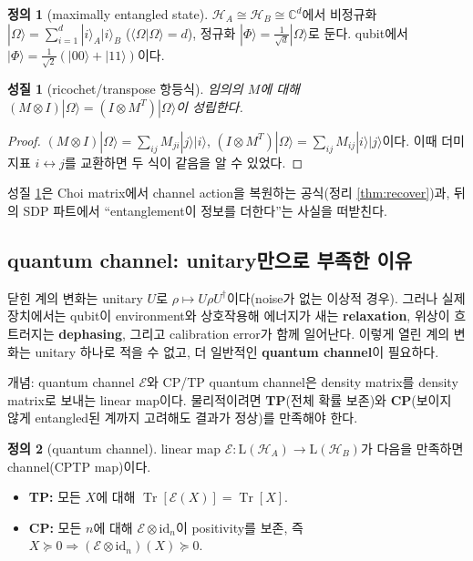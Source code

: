 \documentclass[11pt,a4paper]{article}
\newcommand{\E}{\mathcal{E}}
\newcommand{\Hcal}{\mathcal{H}}
\newcommand{\Tr}{\operatorname{Tr}}
\newcommand{\id}{\mathrm{id}}
\newcommand{\Lin}{\mathrm{L}}
\theoremstyle{definition}
\newtheorem{definition}{정의}[section]
\theoremstyle{plain}
\newtheorem{property}{성질}[section]
\theoremstyle{remark}
\begin{document}
\begin{definition}[maximally entangled state]
$\Hcal_A\cong\Hcal_B\cong\mathbb C^d$에서 비정규화 $|\Omega\rangle=\sum_{i=1}^d|i\rangle_A|i\rangle_B$ ($\langle\Omega|\Omega\rangle=d$), 정규화 $|\Phi\rangle=\tfrac1{\sqrt d}|\Omega\rangle$로 둔다. qubit에서 $|\Phi\rangle=\tfrac1{\sqrt2}(|00\rangle+|11\rangle)$이다.
\end{definition}

\begin{property}[ricochet/transpose 항등식]\label{prop:ricochet}
임의의 $M$에 대해 $(M\otimes I)|\Omega\rangle=(I\otimes M^T)|\Omega\rangle$이 성립한다.
\end{property}
\begin{proof}
$(M\otimes I)|\Omega\rangle=\sum_{ij}M_{ji}|j\rangle|i\rangle$, $(I\otimes M^T)|\Omega\rangle=\sum_{ij}M_{ij}|i\rangle|j\rangle$이다. 이때 더미 지표 $i\leftrightarrow j$를 교환하면 두 식이 같음을 알 수 있었다.
\end{proof}

성질 \ref{prop:ricochet}은 Choi matrix에서 channel action을 복원하는 공식(정리 \ref{thm:recover})과, 뒤의 SDP 파트에서 ``entanglement이 정보를 더한다''는 사실을 떠받친다.

\subsection{quantum channel: unitary만으로 부족한 이유}

닫힌 계의 변화는 unitary $U$로 $\rho\mapsto U\rho U^\dagger$이다(noise가 없는 이상적 경우). 그러나 실제 장치에서는 qubit이 environment와 상호작용해 에너지가 새는 \textbf{relaxation}, 위상이 흐트러지는 \textbf{dephasing}, 그리고 calibration error가 함께 일어난다. 이렇게 열린 계의 변화는 unitary 하나로 적을 수 없고, 더 일반적인 \textbf{quantum channel}이 필요하다.

\begin{conceptbox}{개념: quantum channel $\E$와 CP/TP}
quantum channel은 density matrix를 density matrix로 보내는 linear map이다. 물리적이려면 \textbf{TP}(전체 확률 보존)와 \textbf{CP}(보이지 않게 entangled된 계까지 고려해도 결과가 정상)를 만족해야 한다.
\end{conceptbox}

\begin{definition}[quantum channel]
linear map $\E:\Lin(\Hcal_A)\to\Lin(\Hcal_B)$가 다음을 만족하면 channel(CPTP map)이다.
\begin{itemize}[leftmargin=1.6em]
  \item \textbf{TP:} 모든 $X$에 대해 $\Tr[\E(X)]=\Tr[X]$.
  \item \textbf{CP:} 모든 $n$에 대해 $\E\otimes\id_n$이 positivity를 보존, 즉 $X\succeq0\Rightarrow(\E\otimes\id_n)(X)\succeq0$.
\end{itemize}
\end{definition}
\end{document}

